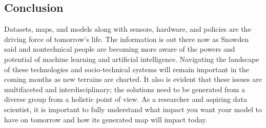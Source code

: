 \documentclass[12pt]{article}
\begin{document}
\subsection*{Conclusion}
Datasets, maps, and models along with sensors, hardware, and policies are the driving force of tomorrow's life. The information is out there now as Snowden said and nontechnical people are becoming more aware of the powers and potential of machine learning and artificial intelligence. 
Navigating the landscape of these technologies and socio-technical systems will remain important in the coming months as new terrains are charted. It also is evident that these issues are multifaceted and interdisciplinary; the solutions need to be generated from a diverse group from a 
holistic point of view. As a researcher and aspiring data scientist, it is important to fully understand what impact you want your model to have on tomorrow and how its generated map will impact today. 



\end{document}
